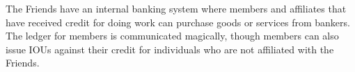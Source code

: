 The Friends have an internal banking system where members and affiliates that have received credit for doing work can purchase goods or services from bankers.
The ledger for members is communicated magically, though members can also issue IOUs against their credit for individuals who are not affiliated with the Friends.